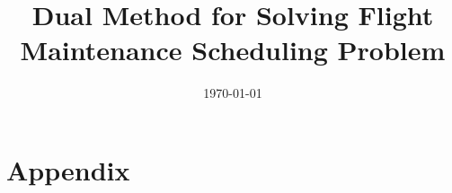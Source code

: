 
\title{Dual Method for Solving Flight Maintenance Scheduling Problem}
\date{\today}


\usepackage{subfiles}
\usepackage{graphicx} 
\usepackage{subfiles} 
\usepackage{subfig}
\usepackage[font=small,labelfont=bf]{caption}










\section*{Appendix}\label{sec:appendix}





